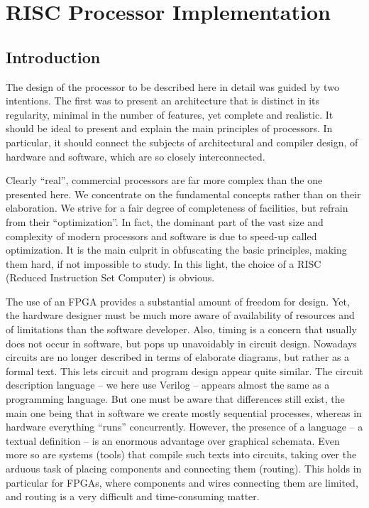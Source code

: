 \chapter{RISC Processor Implementation}
\label{ch:cpu}
\section{Introduction}
The design of the processor to be described here in detail was guided by two intentions. The first
was to present an architecture that is distinct in its regularity, minimal in the number of features, yet
complete and realistic. It should be ideal to present and explain the main principles of processors.
In particular, it should connect the subjects of architectural and compiler design, of hardware and
software, which are so closely interconnected.

Clearly “real”, commercial processors are far more complex than the one presented here. We
concentrate on the fundamental concepts rather than on their elaboration. We strive for a fair
degree of completeness of facilities, but refrain from their “optimization”. In fact, the dominant part
of the vast size and complexity of modern processors and software is due to speed-up called
optimization. It is the main culprit in obfuscating the basic principles, making them hard, if not
impossible to study. In this light, the choice of a RISC (Reduced Instruction Set Computer) is
obvious.

The use of an FPGA provides a substantial amount of freedom for design. Yet, the hardware
designer must be much more aware of availability of resources and of limitations than the software
developer. Also, timing is a concern that usually does not occur in software, but pops up
unavoidably in circuit design. Nowadays circuits are no longer described in terms of elaborate
diagrams, but rather as a formal text. This lets circuit and program design appear quite similar. The
circuit description language – we here use Verilog – appears almost the same as a programming
language. But one must be aware that differences still exist, the main one being that in software we
create mostly sequential processes, whereas in hardware everything “runs” concurrently. However,
the presence of a language – a textual definition – is an enormous advantage over graphical
schemata. Even more so are systems (tools) that compile such texts into circuits, taking over the
arduous task of placing components and connecting them (routing). This holds in particular for
FPGAs, where components and wires connecting them are limited, and routing is a very difficult
and time-consuming matter.

